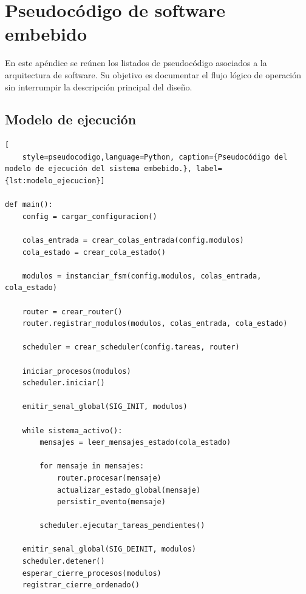 \appendix
\appendixpage
\addappheadtotoc
\section{Pseudocódigo de software embebido}
\label{ap:pseudocodigo_software}

En este apéndice se reúnen los listados de pseudocódigo asociados a la arquitectura de software. Su objetivo es documentar el flujo lógico de operación sin interrumpir la descripción principal del diseño.

\subsection{Modelo de ejecución}

\begin{lstlisting}[
    style=pseudocodigo,language=Python, caption={Pseudocódigo del modelo de ejecución del sistema embebido.}, label={lst:modelo_ejecucion}]
    
def main():
    config = cargar_configuracion()

    colas_entrada = crear_colas_entrada(config.modulos)
    cola_estado = crear_cola_estado()

    modulos = instanciar_fsm(config.modulos, colas_entrada, cola_estado)

    router = crear_router()
    router.registrar_modulos(modulos, colas_entrada, cola_estado)

    scheduler = crear_scheduler(config.tareas, router)

    iniciar_procesos(modulos)
    scheduler.iniciar()

    emitir_senal_global(SIG_INIT, modulos)

    while sistema_activo():
        mensajes = leer_mensajes_estado(cola_estado)

        for mensaje in mensajes:
            router.procesar(mensaje)
            actualizar_estado_global(mensaje)
            persistir_evento(mensaje)

        scheduler.ejecutar_tareas_pendientes()

    emitir_senal_global(SIG_DEINIT, modulos)
    scheduler.detener()
    esperar_cierre_procesos(modulos)
    registrar_cierre_ordenado()
\end{lstlisting}

